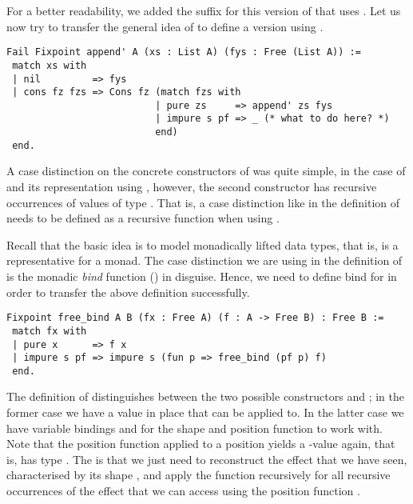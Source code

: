 For a better readability, we added the suffix  for this version of  that uses .
Let us now try to transfer the general idea of  to define a version using .

\begin{verbatim}
Fail Fixpoint append' A (xs : List A) (fys : Free (List A)) :=
 match xs with
 | nil         => fys
 | cons fz fzs => Cons fz (match fzs with
                          | pure zs     => append' zs fys
                          | impure s pf => _ (* what to do here? *)
                          end)
 end.
\end{verbatim}

A case distinction on the concrete constructors of  was quite simple, in the case of  and its representation using , however, the second constructor  has recursive occurrences of values of type .
That is, a case distinction like in the definition of  needs to be defined as a recursive function when using .

Recall that the basic idea is to model monadically lifted data types, that is,  is a representative for a monad.
The case distinction we are using in the definition of  is the monadic \emph{bind} function (\cinl{(>>=)}) in disguise.
Hence, we need to define bind for  in order to transfer the above definition successfully.

\begin{verbatim}
Fixpoint free_bind A B (fx : Free A) (f : A -> Free B) : Free B :=
 match fx with
 | pure x      => f x
 | impure s pf => impure s (fun p => free_bind (pf p) f)
 end.
\end{verbatim}

The definition of  distinguishes between the two possible constructors  and ; in the former case we have a value  in place that  can be applied to.
In the latter case we have variable bindings  and  for the shape and position function to work with.
Note that the position function applied to a position yields a -value again, that is,  has type
.
The is that we just need to reconstruct the effect that we have seen, characterised by its shape , and apply the function  recursively for all recursive occurrences of the effect that we can access using the position function .

